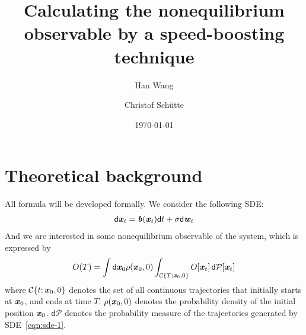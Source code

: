 \documentclass[aip,jcp,a4paper,reprint,onecolumn]{revtex4-1}
\newcommand{\vect}[1]{\textbf{\textit{#1}}}
\newcommand{\dd}{\textsf{d}}
\newcommand{\mc}{\mathcal C}
\newcommand{\pathmeas}{\mathcal P}
\begin{document}
\title{Calculating the nonequilibrium observable by a speed-boosting
technique}
\author{Han Wang}
\author{Christof Sch\"utte}

\date{\today}

\begin{abstract}
\end{abstract}

\maketitle



\section{Theoretical background}

All formula will be developed formally. We consider the following SDE:
\begin{align}\label{eqn:sde-1}
  \dd \vect x_t = \vect b(\vect x_t) \dd t + \sigma\dd \vect w_t
\end{align}
And we are interested in some nonequilibrium observable of the system,
which is expressed by
\begin{align*}
  O(T) = \int \dd\vect x_0 \rho(\vect x_0, 0)
  \int_{\mc\{T; \vect x_0, 0\}} 
  O[\vect x_t]\,\dd\pathmeas[\vect x_t]
\end{align*}
where $\mc\{t; \vect x_0, 0\}$ denotes the set of all continuous
trajectories that initially starts at $\vect x_0$, and ends at time $T$.
$\rho(\vect x_0, 0)$ denotes the probability density of the initial position
$\vect x_0$. $\dd \pathmeas$ denotes the probability measure of the trajectories
generated by SDE~\eqref{eqn:sde-1}.
\end{document}
